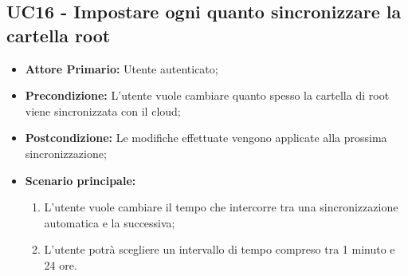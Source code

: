 \subsection{UC16 - Impostare ogni quanto sincronizzare la cartella root}
\label{UC16}
\begin{itemize}
\item \textbf{Attore Primario:} Utente autenticato;
\item \textbf{Precondizione:} L'utente vuole cambiare quanto spesso la cartella di root viene sincronizzata con il cloud;
\item \textbf{Postcondizione:} Le modifiche effettuate vengono applicate alla prossima sincronizzazione;
\item \textbf{Scenario principale:} 
\begin{enumerate}
\item L'utente vuole cambiare il tempo che intercorre tra una sincronizzazione automatica e la successiva;
\item L'utente potrà scegliere un intervallo di tempo compreso tra 1 minuto e 24 ore.
\end{enumerate}
\end{itemize}